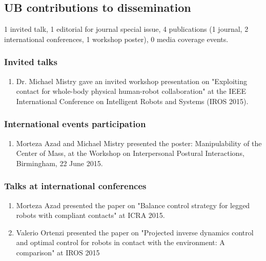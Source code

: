 \subsection{UB contributions to dissemination}

1 invited talk, 1 editorial for journal special issue, 4 publications (1 journal, 2 international conferences, 1 workshop poster), 0 media coverage events. 

\subsubsection{Invited talks}

\begin{enumerate}
\item  Dr. Michael Mistry gave an invited workshop presentation on "Exploiting contact for whole-body physical human-robot collaboration" at the IEEE International Conference on Intelligent Robots and Systems (IROS 2015). 

\end{enumerate}

\subsubsection{International events participation}

\begin{enumerate}

\item  Morteza Azad and Michael Mistry presented the poster: Manipulability of the Center of Mass, at the Workshop on Interpersonal Postural Interactions, Birmingham, 22 June 2015.


\end{enumerate}

\subsubsection{Talks at international conferences}

\begin{enumerate}

\item  Morteza Azad presented the paper on "Balance control strategy for legged robots with compliant contacts" at ICRA 2015.

\item  Valerio Ortenzi presented the paper on "Projected inverse dynamics control and optimal control for robots in contact with the environment: A comparison" at IROS 2015


\end{enumerate}

